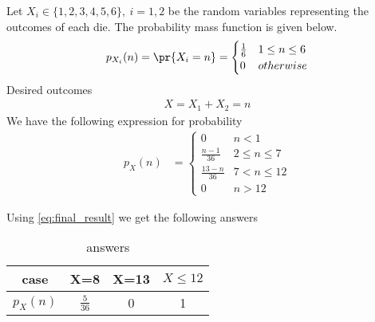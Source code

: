 Let $X_i \in \{1,2,3,4,5,6\},\ i=1,2$ be the random variables representing the outcomes of each die.
The probability mass function is given below.
\begin{align}
\label{eq:outcomes}
p_{X_i}(n) = \pr{X_i = n} = 
\begin{cases}
\frac{1}{6} & 1 \le n \le 6
\\
0 & otherwise
\end{cases}
\end{align}
Desired outcomes
\begin{align}
X=X_1+X_2=n
\end{align}
We have the following expression for probability
\begin{align}
	p_X(n) &=
\begin{cases}
0 & n < 1\\
\frac{n-1}{36} &  2 \le n \le  7 \\
\frac{13-n}{36} & 7 < n \le 12 \\
0 & n > 12
\end{cases}
\label{eq:final_result}
\end{align}

Using \eqref{eq:final_result} we get the following answers

\begin{center}
\begin{table}
\centering
  \label{table:answers}
\caption{answers}
  \begin{tabular}{|c|c|c|c|}
    \hline
    case &  X=8 & X=13 & $X\leq 12$\\
    \hline
    $p_X(n)$ & ${\scriptstyle \frac{5}{36}}$ & 0& 1\\
    \hline
   
\end{tabular}
\end{table}
\end{center}